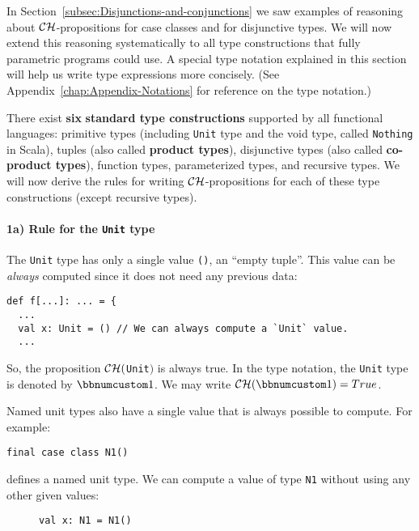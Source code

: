In Section~\ref{subsec:Disjunctions-and-conjunctions} we saw examples
of reasoning about ${\cal CH}$-propositions for case classes and
for disjunctive types. We will now extend this reasoning systematically
to all type constructions that fully parametric programs could use.
A special type notation explained in this section
will help us write type expressions more concisely. (See Appendix~\ref{chap:Appendix-Notations}
for reference on the type notation.)

There exist \textbf{six} \textbf{standard type constructions}
supported by all functional languages: primitive types (including
\lstinline!Unit! type and the void type, called \lstinline!Nothing!
in Scala), tuples (also called \textbf{product
types}), disjunctive types (also called \textbf{co-product
types}), function types, parameterized types, and recursive types.
We will now derive the rules for writing ${\cal CH}$-propositions
for each of these type constructions (except recursive types).

\paragraph{1a) Rule for the \texttt{Unit} type}

The \lstinline!Unit! type has only a single value \lstinline!()!,
an \textsf{``}empty tuple\textsf{''}. This value can be \emph{always} computed since
it does not need any previous data:
\begin{lstlisting}
def f[...]: ... = {
  ...
  val x: Unit = () // We can always compute a `Unit` value.
  ...
\end{lstlisting}
So, the proposition ${\cal CH}($\lstinline!Unit!$)$ is always true.
In the type notation, the \lstinline!Unit! type is denoted by $\bbnum 1$.
We may write $\mathcal{CH}(\bbnum 1)=True$.

Named unit types also have a single value
that is always possible to compute. For example:
\begin{lstlisting}
final case class N1()
\end{lstlisting}
defines a named unit type. We can compute a value of type \lstinline!N1!
without using any other given values:

\begin{wrapfigure}{l}{0.42\columnwidth}%
\vspace{-0.8\baselineskip}
\begin{lstlisting}
val x: N1 = N1()
\end{lstlisting}

\vspace{-0.9\baselineskip}
\end{wrapfigure}%

